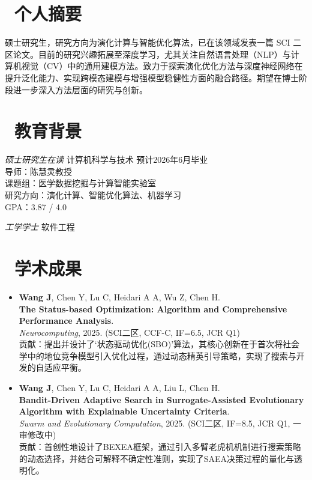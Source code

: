 \documentclass{resume}
\begin{document}
\vspace{0.4cm} 

\section{\faInfoCircle\ 个人摘要}
硕士研究生，研究方向为演化计算与智能优化算法，已在该领域发表一篇 SCI 二区论文。目前的研究兴趣拓展至深度学习，尤其关注自然语言处理（NLP）与计算机视觉（CV）中的通用建模方法。致力于探索演化优化方法与深度神经网络在提升泛化能力、实现跨模态建模与增强模型稳健性方面的融合路径。期望在博士阶段进一步深入方法层面的研究与创新。

\section{\faGraduationCap\ 教育背景}

\textit{硕士研究生在读} \quad 计算机科学与技术 \quad 预计2026年6月毕业\\
导师：陈慧灵教授\\
课题组：医学数据挖掘与计算智能实验室\\
研究方向：演化计算、智能优化算法、机器学习\\
GPA：3.87 / 4.0

\textit{工学学士} \quad 软件工程

\section{\faFileTextO\ 学术成果}
\begin{itemize}
  \item \textbf{Wang J}, Chen Y, Lu C, Heidari A A, Wu Z, Chen H.\\
  \textbf{The Status-based Optimization: Algorithm and Comprehensive Performance Analysis}.\\
  \textit{Neurocomputing}, 2025. (SCI二区, CCF-C, IF=6.5, JCR Q1)\\
  贡献：提出并设计了‘状态驱动优化(SBO)’算法，其核心创新在于首次将社会学中的地位竞争模型引入优化过程，通过动态精英引导策略，实现了搜索与开发的自适应平衡。
  \item \textbf{Wang J}, Chen Y, Lu C, Heidari A A, Liu L, Chen H.\\
  \textbf{Bandit-Driven Adaptive Search in Surrogate-Assisted Evolutionary Algorithm with Explainable Uncertainty Criteria}.\\
  \textit{Swarm and Evolutionary Computation}, 2025. (SCI二区, IF=8.5, JCR Q1, 一审修改中)\\
  贡献：首创性地设计了BEXEA框架，通过引入多臂老虎机机制进行搜索策略的动态选择，并结合可解释不确定性准则，实现了SAEA决策过程的量化与透明化。
\end{itemize}
\end{document}
